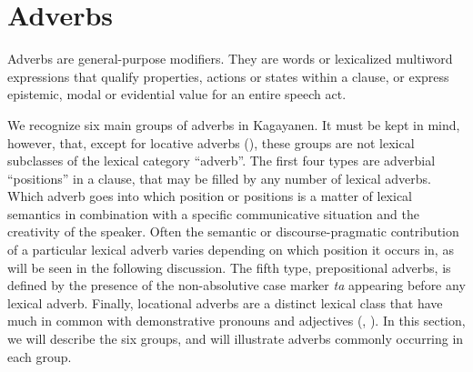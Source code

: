 \section{Adverbs}
\largerpage
\label{bkm:Ref420904083}\label{sec:adverbs} 

Adverbs are general-purpose modifiers. They are words or lexicalized multiword expressions that qualify properties, actions or states within a clause, or express epistemic, modal or evidential value for an entire speech act.


We recognize six main groups of adverbs in Kagayanen. It must be kept in mind, however, that, except for locative adverbs (), these groups are not lexical subclasses of the lexical category “adverb”. The first four types are adverbial “positions” in a clause, that may be filled by any number of lexical adverbs. Which adverb goes into which position or positions is a matter of lexical semantics in combination with a specific communicative situation and the creativity of the speaker. Often the semantic or discourse-pragmatic contribution of a particular lexical adverb varies depending on which position it occurs in, as will be seen in the following discussion. The fifth type, prepositional adverbs, is defined by the presence of the non-absolutive case marker \textit{ta} appearing before any lexical adverb. Finally, locational adverbs are a distinct lexical class that have much in common with demonstrative pronouns and adjectives (, ). In this section, we will describe the six groups, and will illustrate adverbs commonly occurring in each group.

